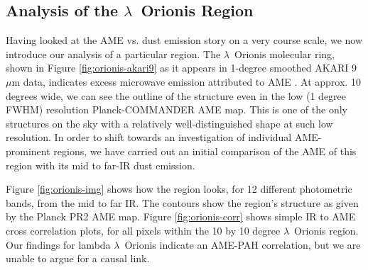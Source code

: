 \documentclass[preprint2,longabstract]{aastex}
\begin{document}
\subsection{Analysis of the $\lambda$~Orionis Region}

	Having looked at the AME vs. dust emission story on a very course scale, we now introduce our analysis of a particular region. The $\lambda$~Orionis molecular ring, shown in Figure \ref{fig:orionis-akari9} as it appears in 1-degree smoothed AKARI 9~$\mu$m data, indicates excess microwave emission attributed to AME \citep{planck15XXV}. At approx. 10 degrees wide, we can see the outline of the structure even in the low (1 degree FWHM) resolution Planck-COMMANDER AME map. This is one of the only structures on the sky with a relatively well-distinguished shape at such low resolution. In order to shift towards an investigation of individual AME-prominent regions, we have carried out an initial comparison of the AME of this region with its mid to far-IR dust emission.

	Figure \ref{fig:orionis-img} shows how the region looks, for 12 different photometric bands, from the mid to far IR. The contours show the region's structure as given by the Planck PR2 AME map. Figure \ref{fig:orionis-corr} shows simple IR to AME cross correlation plots, for all pixels within the 10 by 10 degree $\lambda$~Orionis region. Our findings for lambda $\lambda$~Orionis indicate an AME-PAH correlation, but we are unable to argue for a causal link.
\end{document}
